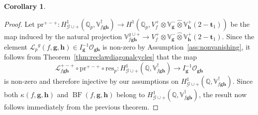 \documentclass[a4paper,11pt]{amsart}
\theoremstyle{plain}
\newtheorem{corollary}[theorem]{Corollary}
\theoremstyle{definition}
\theoremstyle{remark}
\newcommand{\bb}{\mathbb}
\newcommand{\cl}{\mathcal}
\DeclareMathOperator{\BF}{BF}
\newcommand{\Lp}{{\mathscr{L}_p}}
\newcommand{\hg}{{\mathbf{g}}}
\newcommand{\hh}{{\mathbf h}}
\newcommand{\res}{\mathrm{res}}
\numberwithin{equation}{section}
\begin{document}
\begin{corollary}

\end{corollary}
\begin{proof}
    Let $\mathrm{pr}^{+-+}:H^1_{\cl{G}\cup +}(\bb{Q}_p,\bb{V}_{f\hg\hh}^\dagger)\rightarrow H^1(\bb{Q}_p,V_f^+\otimes\bb{V}_\hg^-\hat{\otimes}\bb{V}_\hh^+(2-\mathbf{t}_1))$ be the map induced by the natural projection $\bb{V}_{f\hg\hh}^{g\cup +}\rightarrow V_f^+\otimes\bb{V}_\hg^-\hat{\otimes}\bb{V}_\hh^+(2-\mathbf{t}_1)$. Since the element $\Lp^g(f,\hg,\hh)\in I_{\hg}^{-1}\cl{O}_{\hg\hh}$ is non-zero by Assumption~\ref{ass:nonvanishing}, it follows from Theorem~\ref{thm:reclawdiagonalcycles} that the map
    \[
    \cl{L}_{f\hg\hh}^{+-+}\circ\mathrm{pr}^{+-+}\circ\res_p: H^1_{\cl{G}\cup +}(\bb{Q},\bb{V}_{f\hg\hh}^\dagger) \longrightarrow I_{\hg}^{-1} \cl{O}_{\hg\hh}
    \]
    is non-zero and therefore injective by our assumptions on $H^1_{\cl{G}\cup +}(\bb{Q}, \bb{V}_{f\hg\hh}^\dagger)$. Since both $\kappa(f,\hg,\hh)$ and $\BF(f,\hg,\hh)$ belong to $H^1_{\cl{G}\cup +}(\bb{Q},\bb{V}_{f\hg\hh}^\dagger)$, the result now follows immediately from the previous theorem. 
\end{proof}
\end{document}
